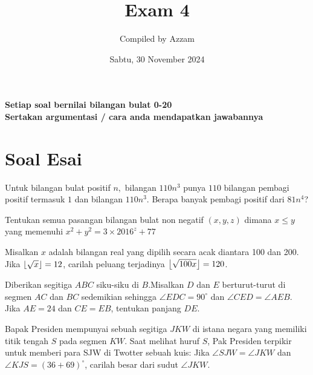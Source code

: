 \documentclass[12pt]{scrartcl}
\begin{document}
	\title{Exam 4} %
	\date{Sabtu, 30 November 2024}
	\author{Compiled by Azzam}
	\maketitle

\renewcommand*\contentsname{Daftar Isi}
\tableofcontents

\newpage

\textbf{Setiap soal bernilai bilangan bulat 0-20}\\
\textbf{Sertakan argumentasi / cara anda mendapatkan jawabannya}
	
\section{Soal Esai} 
		\begin{soalbaru}
		Untuk bilangan bulat positif $n,$ bilangan $110n^3$ punya $110$ bilangan pembagi positif termasuk $1$ dan bilangan $110n^3.$ Berapa banyak pembagi positif dari $81n^4$?
		\end{soalbaru}
        
	\begin{soalbaru}
	Tentukan semua pasangan bilangan bulat non negatif $(x,y,z)$ dimana $x \le y$ yang memenuhi $x^2+y^2=3\times 2016^z+77$
	\end{soalbaru}

    	\begin{soalbaru}
	Misalkan $x$ adalah bilangan real yang dipilih secara acak diantara 100 dan 200. Jika $\left\lfloor \sqrt{x} \right\rfloor=12$, carilah peluang terjadinya $\left\lfloor \sqrt{100x} \right\rfloor=120$.
	\end{soalbaru}
	
	\begin{soalbaru}
	Diberikan segitiga $ABC$ siku-siku di $B$.Misalkan $D$ dan $E$ berturut-turut di segmen $AC$ dan $BC$ sedemikian sehingga $\angle EDC= 90^\circ$ dan $\angle CED = \angle AEB$. Jika $AE = 24$ dan $CE=EB$, tentukan panjang $DE$.
	\end{soalbaru}

    	\begin{soalbaru}
	Bapak Presiden mempunyai sebuah segitiga $JKW$ di istana negara yang memiliki titik tengah $S$ pada segmen $KW$. Saat melihat huruf $S$, Pak Presiden terpikir untuk memberi para SJW di Twotter sebuah kuis: Jika $\angle SJW = \angle JKW$ dan $\angle KJS = (36+69)^\circ$, carilah besar dari sudut $\angle JKW$.
	\end{soalbaru}
\end{document}
